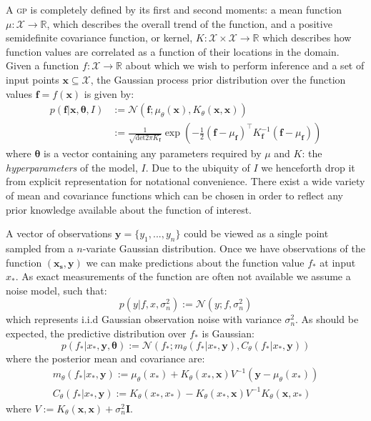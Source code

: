 \documentclass{article}
\newcommand{\vect}[1]{\mathbf{#1}}
\newcommand{\xd}{\vect{x}}
\newcommand{\yd}{\vect{y}}
\begin{document}
A {\scshape gp} is completely defined by its first and second moments: a mean function $\mu : \mathcal{X} \rightarrow \mathbb{R}$, which describes the overall trend of the function, and a positive semidefinite covariance function, or kernel, $K : \mathcal{X} \times \mathcal{X} \rightarrow \mathbb{R}$ which describes how function values are correlated as a function of their locations in the domain. Given a function $f : \mathcal{X} \rightarrow \mathbb{R}$ about which we wish to perform inference and a set of input points $\mathbf{x} \subseteq \mathcal{X}$, the Gaussian process prior distribution over the function values $\mathbf{f} = f(\mathbf{x})$ is given by:
\begin{align}
p(\mathbf{f} | \mathbf{x},\bm{\theta},I) &:= \mathcal{N}\left( \mathbf{f};\mu_\theta(\mathbf{x}),K_\theta(\mathbf{x},\mathbf{x}) \right) \nonumber \\
&:= \frac{1}{\sqrt{\mathrm{det} 2 \pi K_{\mathbf{f}}} } \exp \left( - \frac{1}{2} (\mathbf{f}-\mu_{\mathbf{f}})^\top K_\mathbf{f}^{-1} (\mathbf{f}-\mu_{\mathbf{f}})  \right)
\end{align}
where $\bm{\theta}$ is a vector containing any parameters required by $\mu$ and $K$: the \emph{hyperparameters} of the model, $I$. Due to the ubiquity of $I$ we henceforth drop it from explicit representation for notational convenience. %
There exist a wide variety of mean and covariance functions which can be chosen in order to reflect any prior knowledge available about the function of interest. 

A vector of observations $\mathbf{y} = \{ y_1,...,y_n\}$ could be viewed as a single point sampled from a $n$-variate Gaussian distribution. Once we have observations of the function $(\mathbf{x_s},\yd)$ we can make predictions about the function value $f_*$ at input $x_*$. As exact measurements of the function are often not available we assume a noise model, such that:
\begin{equation}\label{obsnoise}
p(y | f, x, \sigma_n^2) := \mathcal{N}(y; f, \sigma_n^2)
\end{equation} 
which represents i.i.d Gaussian observation noise with variance $\sigma_n^2$. As should be expected, the predictive distribution over $f_*$ is Gaussian:
\begin{equation}\label{posteriorpred}
p(f_* | x_*, \yd,\bm{\theta}) := \mathcal{N} ( f_* ; m_\theta(f_* | x_*, \yd), C_\theta(f_* | x_*, \yd))
\end{equation}
where the posterior mean and covariance are:
\begin{align}
m_\theta(f_* | x_*, \yd) := \mu_\theta(x_*) + K_\theta(x_*,\xd)V^{-1}(\yd - \mu_\theta(x_*))\\
C_\theta(f_* | x_*, \yd) := K_\theta(x_*,x_*) - K_\theta(x_*,\xd)V^{-1}K_\theta(\xd,x_*)
\end{align}
where $V := K_\theta(\xd,\xd) + \sigma_n^2\mathbf{I}$.
\end{document}
